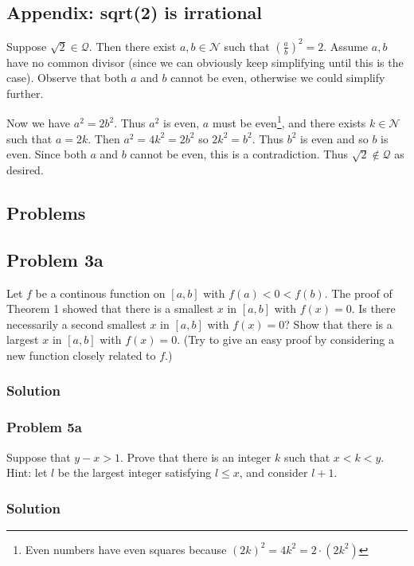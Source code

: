 \subsection{Appendix: sqrt(2) is irrational}\label{sqrt2proof}
Suppose $\sqrt{2}\in\mathcal{Q}$. Then there exist $a,b\in\mathcal{N}$ such that
$\left(\frac{a}{b}\right)^{2}=2$. Assume $a, b$ have no common divisor
(since we can obviously keep simplifying until this is the case).
Observe that both $a$ and $b$ cannot be even, otherwise we could
simplify further.

\vs

Now we have $a^{2}=2b^{2}$. Thus $a^{2}$ is even, $a$ must be
even\footnote{Even numbers have even squares because
  ${(2k)}^{2}=4k^{2}=2\cdot(2k^{2})$}, and there exists
$k\in\mathcal{N}$ such that $a=2k$. Then $a^{2}=4k^{2}=2b^{2}$ so
$2k^{2}=b^{2}$. Thus $b^{2}$ is even and so $b$ is even. Since both
$a$ and $b$ cannot be even, this is a contradiction. Thus
$\sqrt{2}\notin\mathcal{Q}$ as desired.

\subsection{Problems}
\subsection*{Problem 3a}
Let $f$ be a continous function on $[a, b]$ with $f(a)<0<f(b)$. The
proof of Theorem 1 showed that there is a smallest $x$ in $[a,b]$ with
$f(x)=0$. Is there necessarily a second smallest $x$ in $[a,b]$ with
$f(x)=0$? Show that there is a largest $x$ in $[a,b]$ with $f(x)=0$.
(Try to give an easy proof by considering a new function closely
related to $f$.)

\subsubsection*{Solution}

\subsubsection*{Problem 5a}
Suppose that $y-x>1$. Prove that there is an integer $k$ such that
$x<k<y$. Hint: let $l$ be the largest integer satisfying $l\leq x$, and
consider $l+1$.

\subsubsection*{Solution}

